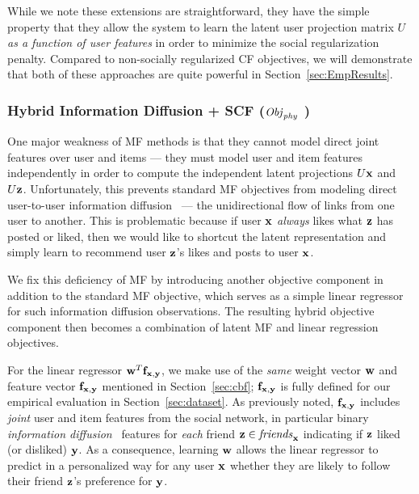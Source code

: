 While we note these extensions are straightforward, they have
the simple property that they allow the system to learn the latent
user projection matrix $U$ \emph{as a function of user features}
in order to minimize the social regularization penalty.
Compared to non-socially regularized CF objectives, we will
demonstrate that both of these approaches are quite powerful in 
Section~\ref{sec:EmpResults}.


\subsubsection{Hybrid Information Diffusion + SCF ($\mathit{Obj}_{\mathit{phy}}$ )}

\label{sec:hybrid_scf}

One major weakness of MF methods is that they cannot model direct
joint features over user and items --- they must model user and item
features independently in order to compute the independent latent
projections $U\mathbf{x}$ and $U\mathbf{z}$.  Unfortunately, this prevents standard MF
objectives from modeling direct user-to-user information
diffusion~\cite{inf_diffusion} --- the 
unidirectional flow of links from one user to another.
This is problematic because if user $\mathbf{x}$ \emph{always} likes what $\mathbf{z}$
has posted or liked, then we would like to shortcut the latent
representation and simply learn to recommend user $\mathbf{z}$'s likes and posts 
to user $\mathbf{x}$.

We fix this deficiency of MF by introducing another objective component
in addition to the standard MF objective, which serves as
a simple linear regressor for such information diffusion
observations.  The resulting hybrid objective component then becomes a
combination of latent MF and linear regression objectives.

For the linear regressor $\mathbf{w}^T \mathbf{f}_{\mathbf{x},\mathbf{y}}$, we make use of the
\emph{same} weight vector $\mathbf{w}$ and feature vector $\mathbf{f}_{\mathbf{x},\mathbf{y}}$
mentioned in Section~\ref{sec:cbf}; $\mathbf{f}_{\mathbf{x},\mathbf{y}}$ is fully defined for
our empirical evaluation in Section~\ref{sec:dataset}.  As previously
noted, $\mathbf{f}_{\mathbf{x},\mathbf{y}}$ includes
\emph{joint} user and item features from the social network, in
particular binary
\emph{information diffusion}~\cite{inf_diffusion} features
for \emph{each} friend $\mathbf{z} \in \mathit{friends}_{\mathbf{x}}$ indicating if $\mathbf{z}$
liked (or disliked) $\mathbf{y}$.  As a consequence, learning $\mathbf{w}$ allows the
linear regressor to predict in a personalized way for any user $\mathbf{x}$
whether they are likely to follow their friend $\mathbf{z}$'s preference for $\mathbf{y}$.

